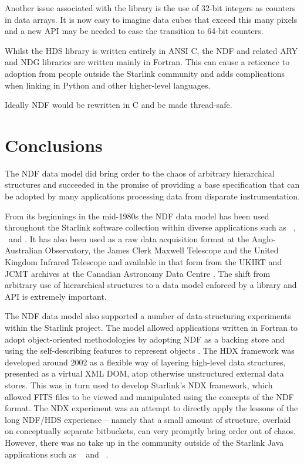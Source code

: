 \documentclass[final,authoryear,5p,times,twocolumn]{elsarticle}
\begin{document}
Another issue associated with the library is the use of 32-bit
integers as counters in data arrays. It is now easy to imagine data
cubes that exceed this many pixels and a new API may be needed to ease
the transition to 64-bit counters.

Whilst the HDS library is written entirely in ANSI C, the NDF and
related ARY \citep{SUN11} and NDG \citep{SUN2} libraries are written
mainly in Fortran.
This can cause a reticence to adoption from people outside the Starlink community and
adds complications when linking in Python and other higher-level
languages.

Ideally NDF would be rewritten in C and be made thread-safe.

\section{Conclusions}
\label{sec:conclusion}

The NDF data model did bring order to the chaos of arbitrary
hierarchical structures and succeeded in the
promise of providing a base specification that can be adopted by many
applications processing data from disparate instrumentation.

From its beginnings in the mid-1980s the NDF data model has been used
throughout the Starlink software collection within diverse
applications such as \smurf\ \citep{2013MNRAS.430.2545C},
\ccdpack\, \gaia\ and \KAPPA.
It has also been used as a raw data acquisition format at the
Anglo-Australian Observatory, the James Clerk Maxwell Telescope and the United Kingdom Infrared
Telescope and available in that form
from the UKIRT and JCMT archives at the Canadian Astronomy Data Centre
\citep{2008ASPC..394..450E,P01_adassxxiii}. The shift from arbitrary
use of hierarchical structures to a data model enforced by a library
and API is extremely important.

The NDF data model also supported a number of data-structuring
experiments within the Starlink project.
The model allowed applications written in Fortran to
adopt object-oriented methodologies by adopting NDF as a backing store
and using the self-describing features to represent objects
\citep{1993ASPC...52..199B}.
The HDX framework \citep{2003ASPC..295..221G} was developed around 2002 as a flexible
way of layering high-level data structures, presented as a virtual XML
DOM, atop otherwise unstructured external data stores.  This was in
turn used to develop Starlink's NDX framework, which allowed FITS
files to be viewed and manipulated using the concepts of the NDF
format.  The NDX experiment was an attempt to directly apply the
lessons of the long NDF/HDS experience -- namely that a small amount of
structure, overlaid on conceptually separate bitbuckets, can very
promptly bring order out of chaos.
However, there was no take up in the community outside of the Starlink Java applications
such as \treeview\ \citep{2003ASPC..295..445B} and
\splat\ \citep[][ascl:1402.007]{2005ASPC..347...22D}.
\end{document}
